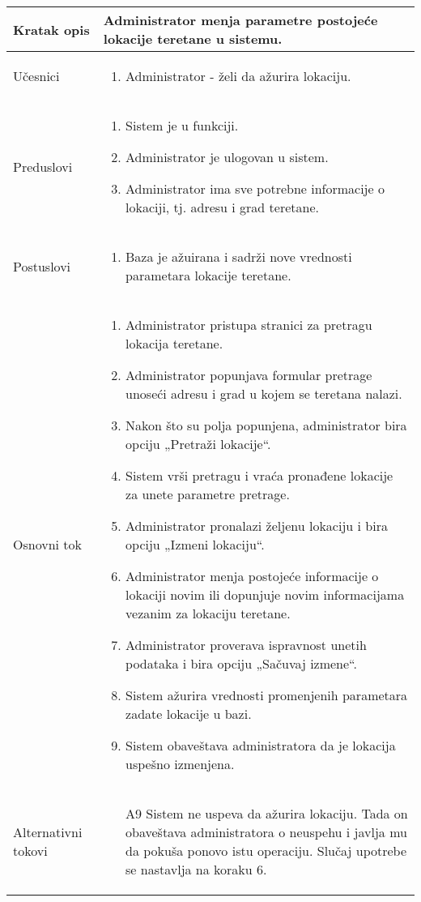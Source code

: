 \documentclass[../main.tex]{subfiles}
\begin{document}
\begin{longtable}{| p{} | p{} |} 

\hline
    Kratak opis &  Administrator menja parametre postojeće lokacije teretane u sistemu.\\ 
\hline    
    Učesnici & 
    	\begin{enumerate}
        \item Administrator - želi da ažurira lokaciju.
     \end{enumerate}\\
\hline
   Preduslovi & \begin{enumerate}
       \item Sistem je u funkciji.
       \item Administrator je ulogovan u sistem.
       \item Administrator ima sve potrebne informacije o lokaciji, tj. adresu i grad teretane.
   \end{enumerate}\\
\hline  
    Postuslovi & \begin{enumerate}
        \item Baza je ažuirana i sadrži nove vrednosti parametara lokacije teretane.
    \end{enumerate}\\
\hline
    Osnovni tok & \begin{enumerate}
        \item Administrator pristupa stranici za pretragu lokacija teretane.
        \item Administrator popunjava formular pretrage unoseći adresu i grad u kojem se teretana nalazi.
        \item Nakon što su polja popunjena, administrator bira opciju „Pretraži lokacije“.
        \item Sistem vrši pretragu i vraća pronađene lokacije za unete parametre pretrage.
        \item Administrator pronalazi željenu lokaciju i bira opciju „Izmeni lokaciju“.
        \item Administrator menja postojeće informacije o lokaciji novim ili dopunjuje novim informacijama vezanim za lokaciju teretane.
        \item Administrator proverava ispravnost unetih podataka i bira opciju „Sačuvaj izmene“.
        \item Sistem ažurira vrednosti promenjenih parametara zadate lokacije u bazi.
        \item Sistem obaveštava administratora da je lokacija uspešno izmenjena.
    \end{enumerate}\\
\hline
    Alternativni tokovi & \begin{itemize}
        \item[A9]  Sistem ne uspeva da ažurira lokaciju. Tada on obaveštava administratora o neuspehu i javlja mu da pokuša ponovo istu operaciju. Slučaj upotrebe se nastavlja na koraku 6.


\end{itemize}
\end{longtable}
\end{document}
